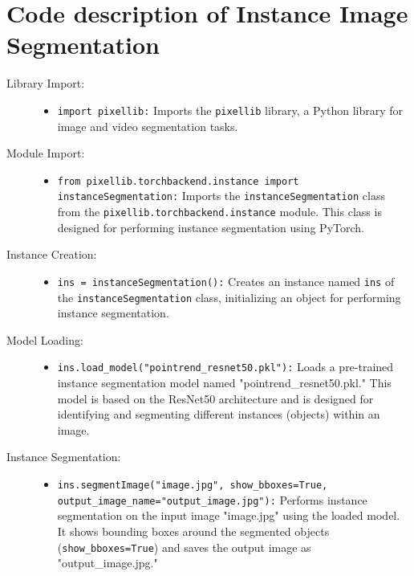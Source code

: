 \section*{Code description of Instance Image Segmentation}				
\begin{description}
    \item[Library Import:]
    \begin{itemize}
        \item \texttt{import pixellib:} Imports the \texttt{pixellib} library, a Python library for image and video segmentation tasks.
    \end{itemize}
    
    \item[Module Import:]
    \begin{itemize}
        \item \texttt{from pixellib.torchbackend.instance import instanceSegmentation:} Imports the \texttt{instanceSegmentation} class from the \texttt{pixellib.torchbackend.instance} module. This class is designed for performing instance segmentation using PyTorch.
    \end{itemize}
    
    \item[Instance Creation:]
    \begin{itemize}
        \item \texttt{ins = instanceSegmentation():} Creates an instance named \texttt{ins} of the \texttt{instanceSegmentation} class, initializing an object for performing instance segmentation.
    \end{itemize}
    
    \item[Model Loading:]
    \begin{itemize}
        \item \texttt{ins.load\_model("pointrend\_resnet50.pkl"):} Loads a pre-trained instance segmentation model named "pointrend\_resnet50.pkl." This model is based on the ResNet50 architecture and is designed for identifying and segmenting different instances (objects) within an image.
    \end{itemize}
    
    \item[Instance Segmentation:]
    \begin{itemize}
        \item \texttt{ins.segmentImage("image.jpg", show\_bboxes=True, output\_image\_name="output\_image.jpg"):} Performs instance segmentation on the input image "image.jpg" using the loaded model. It shows bounding boxes around the segmented objects (\texttt{show\_bboxes=True}) and saves the output image as "output\_image.jpg."
    \end{itemize}
\end{description}

